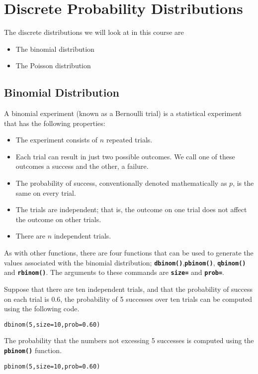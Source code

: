 \documentclass[a4paper,12pt]{article}
\begin{document}
\section{Discrete Probability Distributions}
The discrete distributions we will look at in this course are
\begin{itemize}
\item The binomial distribution
\item The Poisson distribution
\end{itemize}
\subsection{Binomial Distribution}

A binomial experiment (known as a Bernoulli trial) is a statistical experiment that has the following properties: 

\begin{itemize}
\item	The experiment consists of $n$ repeated trials.
\item	Each trial can result in just two possible outcomes. We call one of these outcomes a success and the other, a failure.
\item	The probability of success, conventionally denoted mathematically as $p$, is the same on every trial.
\item	The trials are independent; that is, the outcome on one trial does not affect the outcome on other trials.
\item	There are $n$ independent trials.
\end{itemize}
 

As with other functions, there are four functions that can be used to generate the values associated with the binomial distribution; \textbf{\texttt{dbinom()}},\textbf{\texttt{pbinom()}}, \textbf{\texttt{qbinom()}} and \textbf{\texttt{rbinom()}}.
The arguments to these commands are \texttt{\textbf{size=}} and \texttt{\textbf{prob=}}.

Suppose that there are ten independent trials, and that the probability of success on each trial is 0.6, the probability of 5 successes over ten trials can be computed using the following code.
\begin{framed}
\begin{verbatim}
dbinom(5,size=10,prob=0.60)
\end{verbatim}
\end{framed}
The probability that the numbers not excessing 5 successes is computed using the \textbf{\texttt{pbinom()}} function.
\begin{framed}
\begin{verbatim}
pbinom(5,size=10,prob=0.60)
\end{verbatim}
\end{framed}
\end{document}
